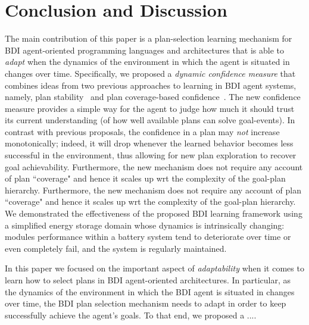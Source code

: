 \section{Conclusion and Discussion}\label{sec:discussion}

The main contribution of this paper is a plan-selection learning mechanism for BDI agent-oriented programming languages and architectures that is able to \emph{adapt} when the dynamics of the environment in which the agent is situated in changes over time.
Specifically, we proposed a \emph{dynamic confidence measure} that combines ideas from two previous approaches to learning in BDI agent systems, namely, plan stability~\cite{airiau09:enhancing} and plan coverage-based confidence~\cite{singh10:extending}. The new confidence measure provides a simple way for the agent to judge how much it should trust its current understanding (of how well available plans can solve goal-events). 
In contrast with previous proposals, the confidence in a plan may \emph{not} increase monotonically; indeed, it will drop whenever the learned behavior becomes less successful in the environment, thus allowing for new plan exploration to recover goal achievability. Furthermore, the new mechanism does not require any account of plan ``coverage" and hence it scales up wrt the complexity of the goal-plan hierarchy. Furthermore, the new mechanism does not require any account of plan ``coverage" and hence it scales up wrt the complexity of the goal-plan hierarchy.
We demonstrated the effectiveness of the proposed BDI learning framework using a simplified energy storage domain whose dynamics is intrinsically changing: modules performance within a battery system tend to deteriorate over time or even completely fail, and the system is regularly maintained.  

In this paper we focused on the important aspect of \emph{adaptability} when it comes to learn how to select plans in BDI agent-oriented architectures. In particular, as the dynamics of the environment in which the BDI agent is situated in changes over time, the BDI plan selection mechanism needs to adapt in order to keep successfully achieve the agent's goals. 
To that end, we proposed a ....

